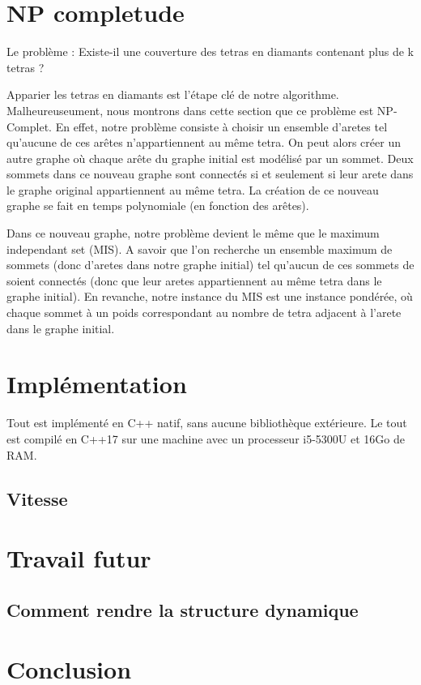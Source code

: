 \documentclass[a4paper,11pt,openany]{article}
\begin{document}
\section{NP completude}

Le problème : Existe-il une couverture des tetras en diamants contenant plus de k tetras ?

Apparier les tetras en diamants est l'étape clé de notre algorithme. Malheureuseument, nous montrons dans cette section que ce problème est NP-Complet.
En effet, notre problème consiste à choisir un ensemble d'aretes tel qu'aucune de ces arêtes n'appartiennent au même tetra.
On peut alors créer un autre graphe où chaque arête du graphe initial est modélisé par un sommet. Deux sommets dans ce nouveau graphe sont connectés si et seulement si leur arete dans le graphe original appartiennent au même tetra.
La création de ce nouveau graphe se fait en temps polynomiale (en fonction des arêtes).

Dans ce nouveau graphe, notre problème devient le même que le maximum independant set (MIS). A savoir que l'on recherche un ensemble maximum de sommets (donc d'aretes dans notre graphe initial) tel qu'aucun de ces sommets de soient connectés (donc que leur aretes appartiennent au même tetra dans le graphe initial).
En revanche, notre instance du MIS est une instance pondérée, où chaque sommet à un poids correspondant au nombre de tetra adjacent à l'arete dans le graphe initial.



\section{Implémentation}
Tout est implémenté en C++ natif, sans aucune bibliothèque extérieure. Le tout est compilé en C++17 sur une machine avec un processeur i5-5300U et 16Go de RAM.
\subsection{Vitesse}

\section{Travail futur}
\subsection{Comment rendre la structure dynamique}

\section{Conclusion}
\end{document}
